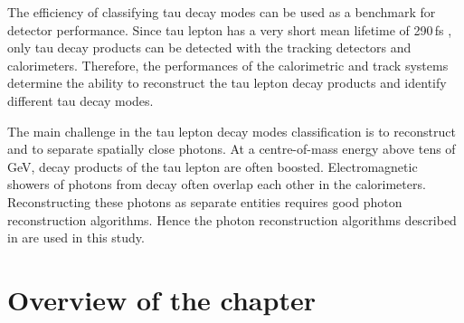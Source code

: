The efficiency of classifying tau decay modes can be used as a benchmark for detector performance. Since tau lepton has a very short mean lifetime of 290\,fs \cite{Abreu:1991jn}, only tau decay products can be detected with the tracking detectors and calorimeters. Therefore, the performances of the calorimetric and track systems determine the ability to reconstruct the tau lepton decay products and identify different tau decay modes.

The main challenge in the tau lepton decay modes  classification is to reconstruct and to separate spatially close photons. At a centre-of-mass energy above tens of GeV, decay products of the tau lepton are often boosted.  Electromagnetic showers of photons from \Ppizero decay often overlap each other in the calorimeters.  Reconstructing these photons as separate entities requires good photon reconstruction algorithms. Hence the photon reconstruction algorithms described in  are used in this study.







%



\section{Overview of the chapter}

